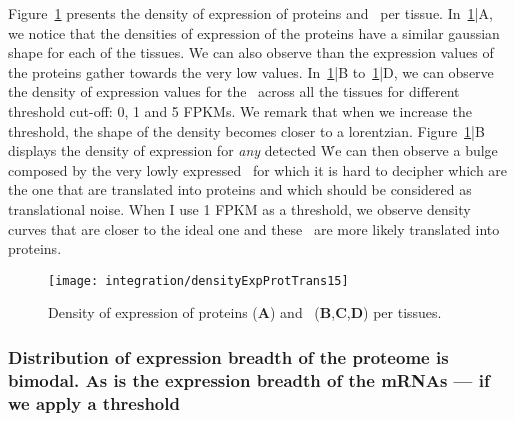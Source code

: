 Figure~\ref{densityExpProtTrans15} presents the density of expression
of proteins and \mRNAs\ per tissue. In~\ref{densityExpProtTrans15}|A,
we notice that the densities of expression of the proteins have a similar gaussian
shape for each of the tissues. We can also observe than the expression values
of the proteins gather towards the very low values.
In~\ref{densityExpProtTrans15}|B to~\ref{densityExpProtTrans15}|D, we can observe
the density of expression values for the \mRNAs\ across all the tissues for
different threshold cut-off: 0, 1 and 5 \glspl{FPKM}.
We remark that when we increase the threshold, the shape
of the density becomes closer to a lorentzian. Figure~\ref{densityExpProtTrans15}|B
displays the density of expression for \emph{any} detected \mRNA\. We can
then observe a bulge composed by the very lowly expressed \mRNAs\, for which it
is hard to decipher which are the one that are translated into proteins and which
should be considered as translational noise. When I use 1 \gls{FPKM} as a threshold,
we observe density curves that are closer to the ideal one and these \mRNAs\ are
more likely translated into proteins.


\begin{figure}%
    \texttt{[image: integration/densityExpProtTrans15]}\centering
    \caption{\label{densityExpProtTrans15}Density of expression of proteins
    (\textbf{A}) and \mRNAs\ (\textbf{B},\textbf{C},\textbf{D}) per tissues.}
\end{figure}

\subsubsection{Distribution of expression breadth of the proteome is bimodal. As is
the expression breadth of the mRNAs --- if we apply a threshold}
\label{sec:IntegrationProteinBimodalExpre}

